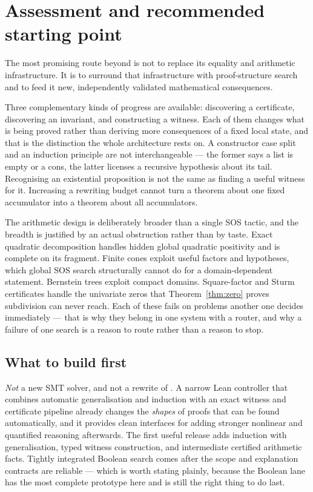 \section{Assessment and recommended starting point}

The most promising route beyond \grind{} is not to replace its equality and
arithmetic infrastructure. It is to surround that infrastructure with
proof-structure search and to feed it new, independently validated mathematical
consequences.

Three complementary kinds of progress are available: discovering a certificate,
discovering an invariant, and constructing a witness. Each of them changes what
is being proved rather than deriving more consequences of a fixed local state,
and that is the distinction the whole architecture rests on. A constructor case
split and an induction principle are not interchangeable --- the former says a
list is empty or a cons, the latter licenses a recursive hypothesis about its
tail. Recognising an existential proposition is not the same as finding a useful
witness for it. Increasing a rewriting budget cannot turn a theorem about one
fixed accumulator into a theorem about all accumulators.

The arithmetic design is deliberately broader than a single SOS tactic, and the
breadth is justified by an actual obstruction rather than by taste. Exact
quadratic decomposition handles hidden global quadratic positivity and is
complete on its fragment. Finite cones exploit useful factors and hypotheses,
which global SOS search structurally cannot do for a domain-dependent statement.
Bernstein trees exploit compact domains. Square-factor and Sturm certificates
handle the univariate zeros that Theorem~\ref{thm:zero} proves subdivision can
never reach. Each of these fails on problems another one decides immediately ---
that is why they belong in one system with a router, and why a failure of one
search is a reason to route rather than a reason to stop.

\subsection{What to build first}

\emph{Not} a new SMT solver, and not a rewrite of \grind{}. A narrow Lean
controller that combines automatic generalisation and induction with an exact
witness and certificate pipeline already changes the \emph{shapes} of proofs
that can be found automatically, and it provides clean interfaces for adding
stronger nonlinear and quantified reasoning afterwards. The first useful release
adds induction with generalisation, typed witness construction, and intermediate
certified arithmetic facts. Tightly integrated Boolean search comes after the
scope and explanation contracts are reliable --- which is worth stating plainly,
because the Boolean lane has the most complete prototype here and is still the
right thing to do last.


